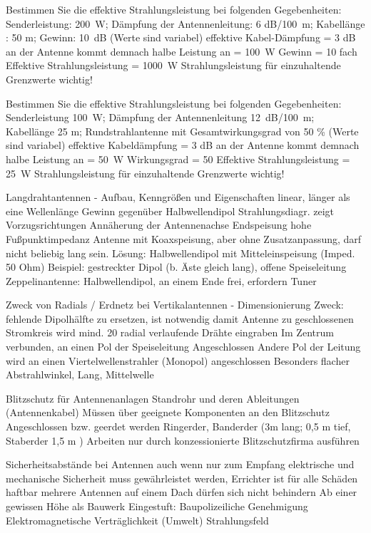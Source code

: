 \documentclass[avery5371,grid,frame,a4paper]{flashcards}
\newcommand{\card}[3]{
  \begin{flashcard}[{\chap} -- #1]{#2}#3\end{flashcard}
}
\begin{document}
\card{79}{Bestimmen Sie die effektive Strahlungsleistung bei folgenden Gegebenheiten: Senderleistung: \SI{200}{\watt}; Dämpfung der Antennenleitung: 6 dB/\SI{100}{\metre}; Kabellänge : 50 m; Gewinn: \SI{10}{\dB} (Werte sind variabel)}{
  effektive Kabel-Dämpfung = 3 dB
an der Antenne kommt demnach halbe
Leistung an = \SI{100}{\watt}
Gewinn = 10 fach
Effektive Strahlungsleistung = \SI{1000}{\watt}
Strahlungsleistung für einzuhaltende 
Grenzwerte wichtig!
}
\card{80}{Bestimmen Sie die effektive Strahlungsleistung bei folgenden Gegebenheiten: Senderleistung \SI{100}{\watt}; Dämpfung der Antennenleitung \SI{12}{\dB}/\SI{100}{\metre}; Kabellänge 25 m; Rundstrahlantenne mit Gesamtwirkungsgrad von 50 \% (Werte sind variabel)}{
  effektive Kabeldämpfung = 3 dB
an der Antenne kommt demnach halbe 
Leistung an = \SI{50}{\watt}
Wirkungsgrad = 50 %
Effektive Strahlungsleistung =  \SI{25}{\watt}
Strahlungsleistung für einzuhaltende
Grenzwerte wichtig!
}
\card{81}{Langdrahtantennen - Aufbau, Kenngrößen und Eigenschaften}{
  linear, länger als eine Wellenlänge
Gewinn gegenüber Halbwellendipol
Strahlungsdiagr. zeigt Vorzugsrichtungen 
Annäherung der Antennenachse
Endspeisung hohe Fußpunktimpedanz
Antenne mit Koaxspeisung, aber ohne Zusatzanpassung,
darf nicht beliebig lang sein. Lösung: Halbwellendipol
mit Mitteleinspeisung (Imped. 50 Ohm)
Beispiel: gestreckter Dipol (b. Äste gleich lang),
offene Speiseleitung
Zeppelinantenne: Halbwellendipol, an einem Ende
frei, erfordern Tuner
}
\card{82}{Zweck von Radials / Erdnetz bei Vertikalantennen - Dimensionierung}{
  Zweck: fehlende Dipolhälfte zu ersetzen, ist notwendig
damit Antenne zu geschlossenen Stromkreis wird
mind. 20 radial verlaufende Drähte eingraben
Im Zentrum verbunden, an einen Pol der Speiseleitung
Angeschlossen
Andere Pol der Leitung wird an einen 
Viertelwellenstrahler (Monopol) angeschlossen
Besonders flacher Abstrahlwinkel, Lang, Mittelwelle
}
\card{83}{Blitzschutz für Antennenanlagen}{
  Standrohr und deren Ableitungen (Antennenkabel)
Müssen über geeignete Komponenten an den Blitzschutz
Angeschlossen bzw. geerdet werden
Ringerder, Banderder (3m lang; 0,5 m tief,
Staberder 1,5 m )
Arbeiten nur durch konzessionierte Blitzschutzfirma
ausführen
}
\card{84}{Sicherheitsabstände bei Antennen}{
  auch wenn nur zum Empfang
elektrische und mechanische Sicherheit muss 
gewährleistet werden, Errichter ist für alle 
Schäden haftbar
mehrere Antennen auf einem Dach dürfen 
sich nicht behindern
Ab einer gewissen Höhe als Bauwerk 
Eingestuft: Baupolizeiliche Genehmigung 
Elektromagnetische Verträglichkeit (Umwelt)
Strahlungsfeld 
}
\end{document}
